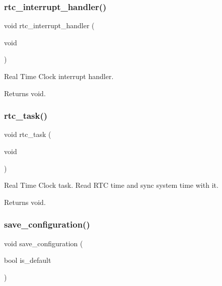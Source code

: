 \subsubsection{\texorpdfstring{rtc\+\_\+interrupt\+\_\+handler()}{rtc\_interrupt\_handler()}}
{\footnotesize\ttfamily void rtc\+\_\+interrupt\+\_\+handler (\begin{DoxyParamCaption}\item[{void}]{ }\end{DoxyParamCaption})}



Real Time Clock interrupt handler. 

\begin{DoxyReturn}{Returns}
void. 
\end{DoxyReturn}
\mbox{\label{rmap_8ino_a52f7fb7ebbd710f2a06b3f6e47c7e7e3}} 
\subsubsection{\texorpdfstring{rtc\+\_\+task()}{rtc\_task()}}
{\footnotesize\ttfamily void rtc\+\_\+task (\begin{DoxyParamCaption}\item[{void}]{ }\end{DoxyParamCaption})}



Real Time Clock task. Read R\+TC time and sync system time with it. 

\begin{DoxyReturn}{Returns}
void. 
\end{DoxyReturn}
\mbox{\label{rmap_8ino_afa979a8cb238fe81bf20654dfd6096ef}} 
\subsubsection{\texorpdfstring{save\+\_\+configuration()}{save\_configuration()}}
{\footnotesize\ttfamily void save\+\_\+configuration (\begin{DoxyParamCaption}\item[{bool}]{is\+\_\+default }\end{DoxyParamCaption})}



